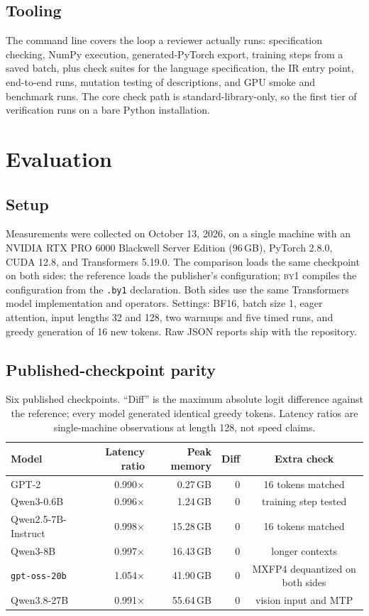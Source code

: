 \documentclass[11pt,a4paper]{article}
\newcommand{\code}[1]{\texttt{#1}}
\newcommand{\byone}{\textsc{by1}}
\newcommand{\q}[1]{\textquotedblleft #1\textquotedblright}
\begin{document}
\subsection{Tooling}

The command line covers the loop a reviewer actually runs: specification
checking, NumPy execution, generated-PyTorch export, training steps from a
saved batch, plus check suites for the language specification, the IR entry
point, end-to-end runs, mutation testing of descriptions, and GPU smoke and
benchmark runs. The core check path is standard-library-only, so the first
tier of verification runs on a bare Python installation.

\section{Evaluation}
\label{sec:eval}

\subsection{Setup}

Measurements were collected on October 13, 2026, on a single machine with an
NVIDIA RTX PRO 6000 Blackwell Server Edition (96\,GB), PyTorch 2.8.0, CUDA
12.8, and Transformers 5.19.0. The comparison loads the same checkpoint on
both sides: the reference loads the publisher's configuration; \byone{}
compiles the configuration from the \code{.by1} declaration. Both sides use
the same Transformers model implementation and operators. Settings: BF16,
batch size 1, eager attention, input lengths 32 and 128, two warmups and five
timed runs, and greedy generation of 16 new tokens. Raw JSON reports ship with
the repository.

\subsection{Published-checkpoint parity}

\begin{table}[t]
\centering
\caption{Six published checkpoints. \q{Diff} is the maximum absolute logit
difference against the reference; every model generated identical greedy
tokens. Latency ratios are single-machine observations at length 128, not
speed claims.}
\label{tab:parity}
\begin{tabular}{@{}lrrrc@{}}
\toprule
Model & Latency ratio & Peak memory & Diff & Extra check \\
\midrule
GPT-2 & 0.990$\times$ & 0.27\,GB & 0 & 16 tokens matched \\
Qwen3-0.6B & 0.996$\times$ & 1.24\,GB & 0 & training step tested \\
Qwen2.5-7B-Instruct & 0.998$\times$ & 15.28\,GB & 0 & 16 tokens matched \\
Qwen3-8B & 0.997$\times$ & 16.43\,GB & 0 & longer contexts \\
\code{gpt-oss-20b} & 1.054$\times$ & 41.90\,GB & 0 & MXFP4 dequantized on
both sides \\
Qwen3.8-27B & 0.991$\times$ & 55.64\,GB & 0 & vision input and MTP \\
\bottomrule
\end{tabular}
\end{table}
\end{document}

